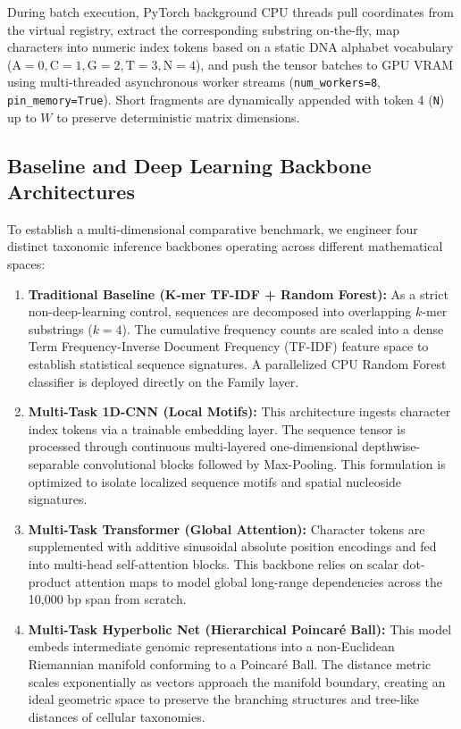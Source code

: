 \documentclass[11pt,a4paper]{article}
\begin{document}
During batch execution, PyTorch background CPU threads pull coordinates from the virtual registry, extract the corresponding substring on-the-fly, map characters into numeric index tokens based on a static DNA alphabet vocabulary ($\text{A}=0, \text{C}=1, \text{G}=2, \text{T}=3, \text{N}=4$), and push the tensor batches to GPU VRAM using multi-threaded asynchronous worker streams (\texttt{num\_workers=8}, \texttt{pin\_memory=True}). Short fragments are dynamically appended with token 4 (\texttt{N}) up to $W$ to preserve deterministic matrix dimensions.

\subsection{Baseline and Deep Learning Backbone Architectures}
To establish a multi-dimensional comparative benchmark, we engineer four distinct taxonomic inference backbones operating across different mathematical spaces:
\begin{enumerate}
    \item \textbf{Traditional Baseline (K-mer TF-IDF + Random Forest):} As a strict non-deep-learning control, sequences are decomposed into overlapping $k$-mer substrings ($k=4$). The cumulative frequency counts are scaled into a dense Term Frequency-Inverse Document Frequency (TF-IDF) feature space to establish statistical sequence signatures. A parallelized CPU Random Forest classifier is deployed directly on the Family layer.
    \item \textbf{Multi-Task 1D-CNN (Local Motifs):} This architecture ingests character index tokens via a trainable embedding layer. The sequence tensor is processed through continuous multi-layered one-dimensional depthwise-separable convolutional blocks followed by Max-Pooling. This formulation is optimized to isolate localized sequence motifs and spatial nucleoside signatures.
    \item \textbf{Multi-Task Transformer (Global Attention):} Character tokens are supplemented with additive sinusoidal absolute position encodings and fed into multi-head self-attention blocks. This backbone relies on scalar dot-product attention maps to model global long-range dependencies across the 10,000 bp span from scratch.
    \item \textbf{Multi-Task Hyperbolic Net (Hierarchical Poincaré Ball):} This model embeds intermediate genomic representations into a non-Euclidean Riemannian manifold conforming to a Poincaré Ball. The distance metric scales exponentially as vectors approach the manifold boundary, creating an ideal geometric space to preserve the branching structures and tree-like distances of cellular taxonomies.
\end{enumerate}
\end{document}
